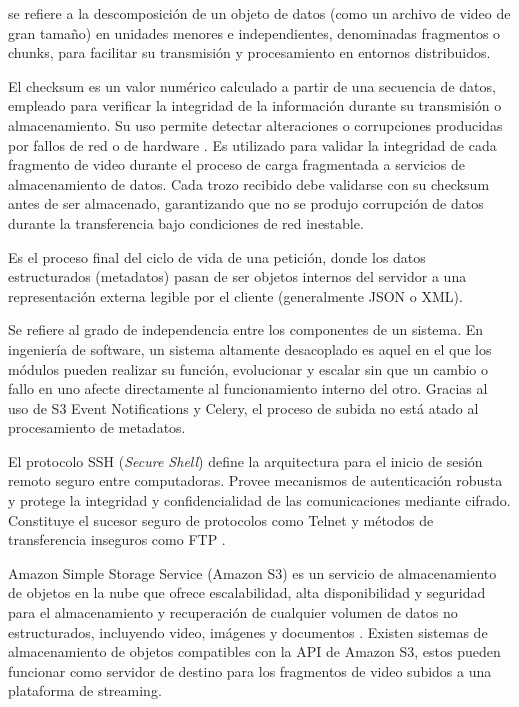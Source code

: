 \begin{description}
\sloppy
  \item[Fragmentación:] se refiere a la descomposición de un objeto de datos (como un archivo de video de gran tamaño) 
  en unidades menores e independientes, denominadas fragmentos o chunks, para facilitar su transmisión y procesamiento 
  en entornos distribuidos.

  \item[Checksum:] El checksum es un valor numérico calculado a partir de una secuencia de datos,
  empleado para verificar la integridad de la información durante su transmisión o almacenamiento.
  Su uso permite detectar alteraciones o corrupciones producidas por fallos de red o de hardware
  \citep{ISO2016}. Es utilizado para validar la integridad
  de cada fragmento de video durante el proceso de carga fragmentada a servicios de almacenamiento de datos.
  Cada trozo recibido debe validarse con su checksum antes de ser almacenado,
  garantizando que no se produjo corrupción de datos durante la transferencia bajo condiciones de
  red inestable.

  \item[Renderizado:] Es el proceso final del ciclo de vida de una petición, donde los datos estructurados (metadatos) 
  pasan de ser objetos internos del servidor a una representación externa legible por el cliente (generalmente JSON o XML).

  \item[Desacoplamiento:] Se refiere al grado de independencia entre los componentes de un sistema. En ingeniería de software, 
  un sistema altamente desacoplado es aquel en el que los módulos pueden realizar su función, evolucionar y escalar sin que un 
  cambio o fallo en uno afecte directamente al funcionamiento interno del otro. Gracias al uso de S3 Event Notifications y Celery, 
  el proceso de subida no está atado al procesamiento de metadatos.

  \item[Protocolo SSH:] El protocolo SSH (\textit{Secure Shell}) define la arquitectura para el
  inicio de sesión remoto seguro entre computadoras. Provee mecanismos de autenticación robusta y
  protege la integridad y confidencialidad de las comunicaciones mediante cifrado. Constituye el
  sucesor seguro de protocolos como Telnet y métodos de transferencia inseguros como FTP
  \citep{Ylonen2006}.

  \item[Amazon S3:] Amazon Simple Storage Service (Amazon S3) es un servicio de almacenamiento de
  objetos en la nube que ofrece escalabilidad, alta disponibilidad y seguridad para el almacenamiento
  y recuperación de cualquier volumen de datos no estructurados, incluyendo video, imágenes y
  documentos \citep{AWS2023}. Existen sistemas de almacenamiento
  de objetos compatibles con la API de Amazon S3, estos pueden funcionar como servidor de destino para los fragmentos de
  video subidos a una plataforma de streaming. 


\end{description}
